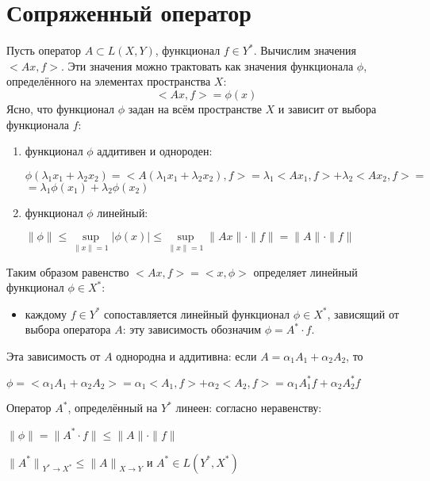 \documentclass[12pt,a4paper,titlepage, oneside]{book}
\theoremstyle{definition}
\theoremstyle{plain}
\theoremstyle{remark}
\theoremstyle{remark}
\theoremstyle{remark}
\theoremstyle{remark}
\theoremstyle{plain}
\theoremstyle{plain}
\begin{document}
\section{Сопряженный оператор}
Пусть оператор $A \subset L(X,Y)$, функционал $f \in Y^*$. Вычислим значения $<Ax,f>$. Эти значения можно трактовать как значения функционала $\phi$, определённого на элементах пространства $X$:
\begin{equation}
<Ax,f>=\phi(x)
\end{equation}
Ясно, что функционал $\phi$ задан на всём пространстве $X$ и зависит от выбора функционала $f$:
\begin{enumerate}
\item функционал $\phi$ аддитивен и однороден:
\begin{center}
$\phi(\lambda_1x_1+\lambda_2x_2) = 
<A(\lambda_1x_1+\lambda_2x_2),f> =
\lambda_1<Ax_1,f> + \lambda_2<Ax_2,f> =$\\$
= \lambda_1\phi(x_1) + \lambda_2\phi(x_2)$
\end{center}
\item функционал $\phi$ линейный:
\begin{center}
$\lVert \phi \lVert \leq \underset{\lVert x\lVert =1}{\sup} 
\vert \phi(x) \vert \leq  \underset{\lVert x\lVert =1}{\sup} 
\lVert Ax \lVert \cdot \lVert f \lVert =
 \lVert A \lVert \cdot \lVert f \lVert $
\end{center}
\end{enumerate}
Таким образом равенство $<Ax,f> = <x,\phi>$ определяет линейный функционал $\phi \in X^*$:
\begin{itemize}
\item каждому $f\in Y^*$ сопоставляется линейный функционал
 $\phi\in X^*$, зависящий от выбора оператора $A$: эту зависимость обозначим $\phi=A^*\cdot f$.
\end{itemize}
Эта зависимость от $A$ однородна и аддитивна:
если $A=\alpha_1A_1+\alpha_2A_2$, то 
\begin{center}
$\phi=<\alpha_1A_1+\alpha_2A_2> = \alpha_1<A_1,f>+\alpha_2<A_2,f> =
\alpha_1A_1^*f+\alpha_2A_2^*f$
\end{center}
Оператор $A^*$, определённый на $Y^*$ линеен: согласно неравенству:
\begin{center}
$\lVert \phi \lVert = \lVert A^* \cdot f \lVert \leq \lVert A \lVert \cdot \lVert f \lVert$
\end{center}
\begin{center}
${\lVert A^* \lVert}_{Y^* \to X^*} \leq 
{\lVert A \lVert}_{X \to Y}$ и $A^* \in L(Y^*,X^*)$
\end{center}
\end{document}
